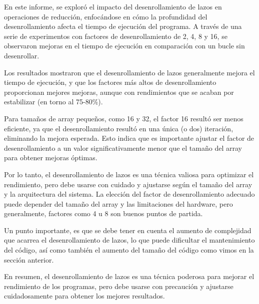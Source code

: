 \documentclass[a4paper,twocolumn]{article}
\begin{document}
En este informe, se exploró el impacto del desenrollamiento de lazos en operaciones de reducción, enfocándose en cómo la profundidad del desenrollamiento afecta el tiempo de ejecución del programa. A través de una serie de experimentos con factores de desenrollamiento de 2, 4, 8 y 16, se observaron mejoras en el tiempo de ejecución en comparación con un bucle sin desenrollar.

Los resultados mostraron que el desenrollamiento de lazos generalmente mejora el tiempo de ejecución, y que los factores más altos de desenrollamiento proporcionan mejores mejoras, aunque con rendimientos que se acaban por estabilizar (en torno al 75-80\%).

Para tamaños de array pequeños, como 16 y 32, el factor 16 resultó ser menos eficiente, ya que el desenrollamiento resultó en una única (o dos) iteración, eliminando la mejora esperada. Esto indica que es importante ajustar el factor de desenrollamiento a un valor significativamente menor que el tamaño del array para obtener mejoras óptimas.

Por lo tanto, el desenrollamiento de lazos es una técnica valiosa para optimizar el rendimiento, pero debe usarse con cuidado y ajustarse según el tamaño del array y la arquitectura del sistema. La elección del factor de desenrollamiento adecuado puede depender del tamaño del array y las limitaciones del hardware, pero generalmente, factores como 4 u 8 son buenos puntos de partida.

Un punto importante, es que se debe tener en cuenta el aumento de complejidad que acarrea el desenrollamiento de lazos, lo que puede dificultar el mantenimiento del código, así como también el aumento del tamaño del código como vimos en la sección anterior.

En resumen, el desenrollamiento de lazos es una técnica poderosa para mejorar el rendimiento de los programas, pero debe usarse con precaución y ajustarse cuidadosamente para obtener los mejores resultados.

	
\end{document}
